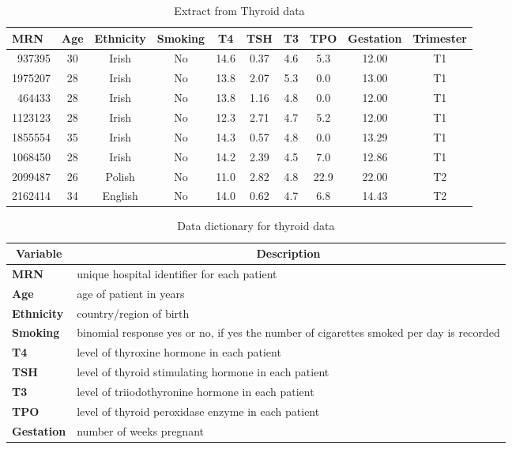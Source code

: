 \documentclass[12pt,a4paper]{report}
\begin{document}
\begin{table}[ht]
\begin{center}
\begin{tabular}{|l|c|c|c|c|c|c|c|c|c|}\hline \multicolumn{1}{|l|}{MRN}&\multicolumn{1}{c|}{Age}&\multicolumn{1}{c|}{Ethnicity}&\multicolumn{1}{c|}{Smoking}&\multicolumn{1}{c|}{T4}&\multicolumn{1}{c|}{TSH}&\multicolumn{1}{c|}{T3}&\multicolumn{1}{c|}{TPO}&\multicolumn{1}{c|}{Gestation}&\multicolumn{1}{c|}{Trimester}\tabularnewline
\hline
~937395 & 30 & Irish & No & 14.6 & 0.37 & 4.6 & 5.3 & 12.00 & T1 \tabularnewline
1975207 & 28 & Irish & No & 13.8 & 2.07 & 5.3 & 0.0 & 13.00 & T1 \tabularnewline
~464433 & 28 & Irish & No & 13.8 & 1.16 & 4.8 & 0.0 & 12.00 & T1 \tabularnewline
1123123 & 28 & Irish & No & 12.3 & 2.71 & 4.7 & 5.2 & 12.00 & T1 \tabularnewline
1855554 & 35 & Irish & No & 14.3 & 0.57 & 4.8 & 0.0 & 13.29 & T1 \tabularnewline
1068450 & 28 & Irish & No & 14.2 & 2.39 & 4.5 & 7.0 & 12.86 & T1 \tabularnewline
2099487 & 26 & Polish & No & 11.0 & 2.82 & 4.8 & 22.9 &22.00 & T2 \tabularnewline
2162414 & 34 & English & No & 14.0 & 0.62 & 4.7 & 6.8 & 14.43 & T2 \tabularnewline
\hline
\end{tabular}
\end{center}
\caption{Extract from Thyroid data}
\label{table:sampledata}
\end{table}

\begin{table}[ht]
\begin{center}
\begin{tabular}{|p{2.5cm}p{10cm}|}\hline
\multicolumn{1}{|c}{\textbf{Variable}}&\multicolumn{1}{c|}{\textbf{Description}}\tabularnewline
\hline\hline
\textbf{MRN}&unique hospital identifier for each patient \tabularnewline
\textbf{Age}&age of patient in years \tabularnewline
\textbf{Ethnicity}&country/region of birth \tabularnewline
\textbf{Smoking}&binomial response yes or no, if yes the number of cigarettes smoked per day is recorded \tabularnewline
\textbf{T4}&level of thyroxine hormone in each patient \tabularnewline
\textbf{TSH}&level of thyroid stimulating hormone in each patient \tabularnewline
\textbf{T3}&level of triiodothyronine hormone in each patient \tabularnewline
\textbf{TPO}&level of thyroid peroxidase enzyme in each patient \tabularnewline
\textbf{Gestation}&number of weeks pregnant \tabularnewline
\hline
\end{tabular}
\end{center}
\caption{Data dictionary for thyroid data}
\label{table:sampledatadict}
\end{table}
\end{document}
